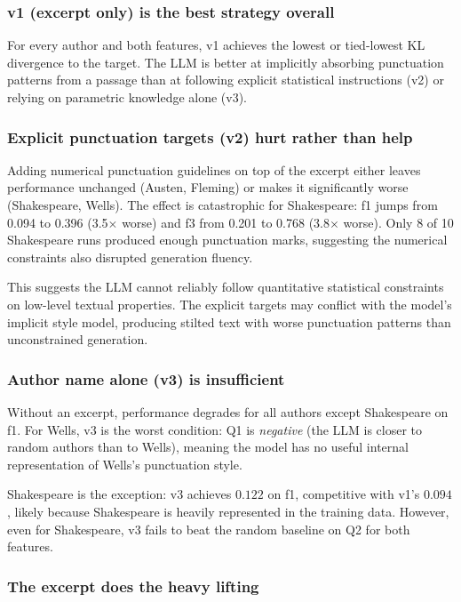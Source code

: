 \documentclass{article}
\begin{document}
\subsubsection{v1 (excerpt only) is the best strategy overall}

For every author and both features, v1 achieves the lowest or tied-lowest KL divergence to the target. The LLM is better at implicitly absorbing punctuation patterns from a passage than at following explicit statistical instructions (v2) or relying on parametric knowledge alone (v3).

\subsubsection{Explicit punctuation targets (v2) hurt rather than help}

Adding numerical punctuation guidelines on top of the excerpt either leaves performance unchanged (Austen, Fleming) or makes it significantly worse (Shakespeare, Wells). The effect is catastrophic for Shakespeare: f1 jumps from 0.094 to 0.396 (3.5$\times$ worse) and f3 from 0.201 to 0.768 (3.8$\times$ worse). Only 8 of 10 Shakespeare runs produced enough punctuation marks, suggesting the numerical constraints also disrupted generation fluency.

This suggests the LLM cannot reliably follow quantitative statistical constraints on low-level textual properties. The explicit targets may conflict with the model's implicit style model, producing stilted text with worse punctuation patterns than unconstrained generation.

\subsubsection{Author name alone (v3) is insufficient}

Without an excerpt, performance degrades for all authors except Shakespeare on f1. For Wells, v3 is the worst condition: Q1 is \emph{negative} (the LLM is closer to random authors than to Wells), meaning the model has no useful internal representation of Wells's punctuation style.

Shakespeare is the exception: v3 achieves $0.122$ on f1, competitive with v1's $0.094$, likely because Shakespeare is heavily represented in the training data. However, even for Shakespeare, v3 fails to beat the random baseline on Q2 for both features.

\subsubsection{The excerpt does the heavy lifting}
\end{document}
